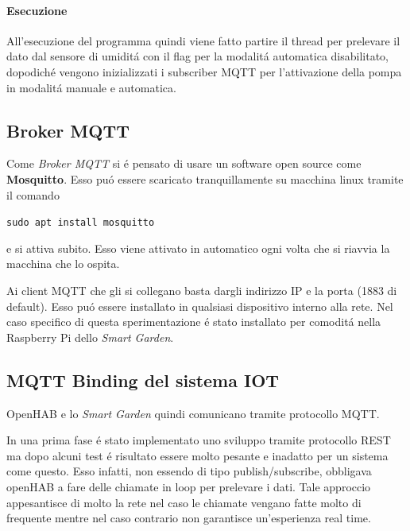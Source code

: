 \paragraph{Esecuzione}
All'esecuzione del programma quindi viene fatto partire il thread per prelevare il dato dal sensore di umidit\'a con il flag per la modalit\'a automatica disabilitato, dopodich\'e vengono inizializzati i subscriber MQTT per l'attivazione della pompa in modalit\'a manuale e automatica.

\subsection{Broker MQTT}
Come {\em Broker MQTT} si \'e pensato di usare un software open source come \textbf{Mosquitto}. Esso pu\'o essere scaricato tranquillamente su macchina linux tramite il comando 

\texttt{sudo apt install mosquitto}

e si attiva subito. Esso viene attivato in automatico ogni volta che si riavvia la macchina che lo ospita.

Ai client MQTT che gli si collegano basta dargli indirizzo IP e la porta (1883 di default). Esso pu\'o essere installato in qualsiasi dispositivo interno alla rete. Nel caso specifico di questa sperimentazione \'e stato installato per comodit\'a nella Raspberry Pi dello {\em Smart Garden}.

\subsection{MQTT Binding del sistema IOT}
OpenHAB e lo {\em Smart Garden} quindi comunicano tramite protocollo MQTT.

In una prima fase \'e stato implementato uno sviluppo tramite protocollo REST ma dopo alcuni test \'e risultato essere molto pesante e inadatto per un sistema come questo. Esso infatti, non essendo di tipo publish/subscribe, obbligava openHAB a fare delle chiamate in loop per prelevare i dati. Tale approccio appesantisce di molto la rete nel caso le chiamate vengano fatte molto di frequente mentre nel caso contrario non garantisce un'esperienza real time.

